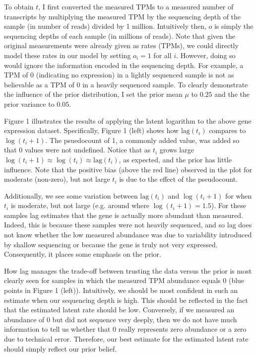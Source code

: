 \documentclass[11pt]{article}
\begin{document}
To obtain $t$, I first converted the measured TPMs to a measured number of transcripts by multiplying the measured TPM by the sequencing depth of the sample (in number of reads) divided by 1 million. Intuitively then, $o$ is simply the sequencing depths of each sample (in millions of reads). Note that given the original measurements were already given as rates (TPMs), we could directly model these rates in our model by setting $o_i = 1$ for all $i$. However, doing so would ignore the information encoded in the sequencing depth. For example, a TPM of 0 (indicating no expression) in a lightly sequenced sample is not as believable as a TPM of 0 in a heavily sequenced sample. To clearly demonstrate the influence of the prior distribution, I set the prior mean $\mu$ to $0.25$ and the the prior variance to $0.05$. 

Figure 1 illustrates the results of applying the latent logarithm to the above gene expression dataset. Specifically, Figure 1 (left) shows how $\textrm{lag}(t_i)$ compares to $\log(t_i + 1)$. The psuedocount of 1, a commonly added value, was added so that 0 values were not undefined. Notice that as $t_i$ grows large $\log(t_i + 1) \approx \log(t_i) \approx \textrm{lag}(t_i)$, as expected, and the prior has little influence. Note that the positive bias (above the red line) observed in the plot for moderate (non-zero), but not large $t_i$ is due to the effect of the pseudocount. 

Additionally, we see some variation between $\textrm{lag}(t_i)$ and $\log(t_i + 1)$ for when $t_i$ is moderate, but not large (e.g. around where $\log(t_i + 1) = 1.5$). For these samples lag estimates that the gene is actually more abundant than measured. Indeed, this is because these samples were not heavily sequenced, and so lag does not know whether the low measured abundance was due to variability introduced by shallow sequencing or because the gene is truly not very expressed. Consequently, it places some emphasis on the prior.

How lag manages the trade-off between trusting the data versus the prior is most clearly seen for samples in which the measured TPM abundance equals 0 (blue points in Figure 1 (left)). Intuitively, we should be most confident in such an estimate when our sequencing depth is high. This should be reflected in the fact that the estimated latent rate should be low. Conversely, if we measured an abundance of 0 but did not sequence very deeply, then we do not have much information to tell us whether that 0 really represents zero abundance or a zero due to technical error. Therefore, our best estimate for the estimated latent rate should simply reflect our prior belief. 
\end{document}
